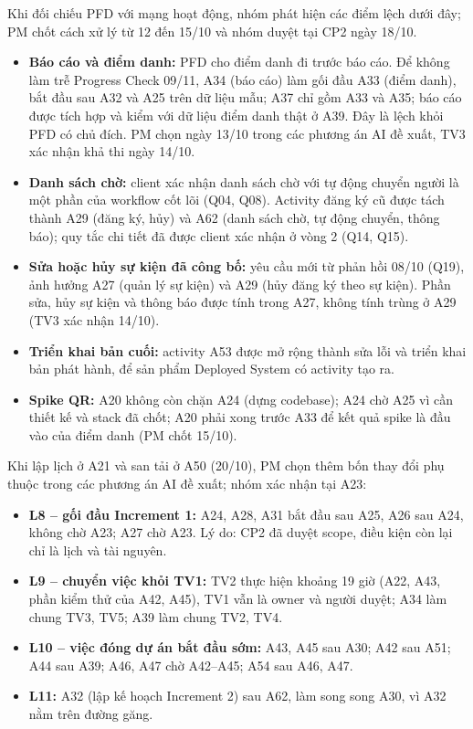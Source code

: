 Khi đối chiếu PFD với mạng hoạt động, nhóm phát hiện các điểm lệch dưới đây; PM chốt cách xử lý từ 12 đến 15/10 và nhóm duyệt tại CP2 ngày 18/10.
\begin{itemize}
  \item \textbf{Báo cáo và điểm danh:} PFD cho điểm danh đi trước báo cáo. Để không làm trễ Progress Check 09/11, A34 (báo cáo) làm gối đầu A33 (điểm danh), bắt đầu sau A32 và A25 trên dữ liệu mẫu; A37 chỉ gồm A33 và A35; báo cáo được tích hợp và kiểm với dữ liệu điểm danh thật ở A39. Đây là lệch khỏi PFD có chủ đích. PM chọn ngày 13/10 trong các phương án AI đề xuất, TV3 xác nhận khả thi ngày 14/10.
  \item \textbf{Danh sách chờ:} client xác nhận danh sách chờ với tự động chuyển người là một phần của workflow cốt lõi (Q04, Q08). Activity đăng ký cũ được tách thành A29 (đăng ký, hủy) và A62 (danh sách chờ, tự động chuyển, thông báo); quy tắc chi tiết đã được client xác nhận ở vòng 2 (Q14, Q15).
  \item \textbf{Sửa hoặc hủy sự kiện đã công bố:} yêu cầu mới từ phản hồi 08/10 (Q19), ảnh hưởng A27 (quản lý sự kiện) và A29 (hủy đăng ký theo sự kiện). Phần sửa, hủy sự kiện và thông báo được tính trong A27, không tính trùng ở A29 (TV3 xác nhận 14/10).
  \item \textbf{Triển khai bản cuối:} activity A53 được mở rộng thành sửa lỗi và triển khai bản phát hành, để sản phẩm Deployed System có activity tạo ra.
  \item \textbf{Spike QR:} A20 không còn chặn A24 (dựng codebase); A24 chờ A25 vì cần thiết kế và stack đã chốt; A20 phải xong trước A33 để kết quả spike là đầu vào của điểm danh (PM chốt 15/10).
\end{itemize}

Khi lập lịch ở A21 và san tải ở A50 (20/10), PM chọn thêm bốn thay đổi phụ thuộc trong các phương án AI đề xuất; nhóm xác nhận tại A23:
\begin{itemize}
  \item \textbf{L8 -- gối đầu Increment 1:} A24, A28, A31 bắt đầu sau A25, A26 sau A24, không chờ A23; A27 chờ A23. Lý do: CP2 đã duyệt scope, điều kiện còn lại chỉ là lịch và tài nguyên.
  \item \textbf{L9 -- chuyển việc khỏi TV1:} TV2 thực hiện khoảng 19 giờ (A22, A43, phần kiểm thử của A42, A45), TV1 vẫn là owner và người duyệt; A34 làm chung TV3, TV5; A39 làm chung TV2, TV4.
  \item \textbf{L10 -- việc đóng dự án bắt đầu sớm:} A43, A45 sau A30; A42 sau A51; A44 sau A39; A46, A47 chờ A42--A45; A54 sau A46, A47.
  \item \textbf{L11:} A32 (lập kế hoạch Increment 2) sau A62, làm song song A30, vì A32 nằm trên đường găng.
\end{itemize}

